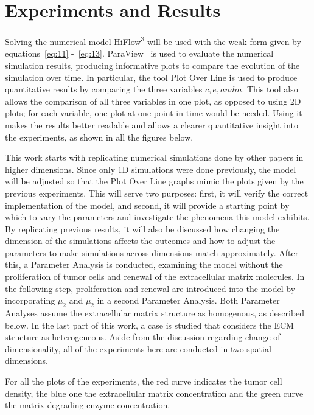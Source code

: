 

\section{Experiments and Results}
\label{sec:experiments}


Solving the numerical model HiFlow\textsuperscript{3}\cite{BibEntry2024Apr} will be used with the weak form given by equations~\ref{eq:11} -~\ref{eq:13}. ParaView~\cite{paraview} is used to evaluate the numerical simulation results, producing informative plots to compare the evolution of the simulation over time. In particular, the tool Plot Over Line is used to produce quantitative results by comparing the three variables $c,e, and m$. This tool also allows the comparison of all three variables in one plot, as opposed to using 2D plots; for each variable, one plot at one point in time would be needed. Using it makes the results better readable and allows a clearer quantitative insight into the experiments, as shown in all the figures below.

This work starts with replicating numerical simulations done by other papers in higher dimensions. Since only 1D simulations were done previously, the model will be adjusted so that the Plot Over Line graphs mimic the plots given by the previous experiments. This will serve two purposes: first, it will verify the correct implementation of the model, and second, it will provide a starting point by which to vary the parameters and investigate the phenomena this model exhibits. By replicating previous results, it will also be discussed how changing the dimension of the simulations affects the outcomes and how to adjust the parameters to make simulations across dimensions match approximately. After this, a Parameter Analysis is conducted, examining the model without the proliferation of tumor cells and renewal of the extracellular matrix molecules. In the following step, proliferation and renewal are introduced into the model by incorporating $\mu_2$ and $\mu_2$ in a second Parameter Analysis. Both Parameter Analyses assume the extracellular matrix structure as homogenous, as described below. In the last part of this work, a case is studied that considers the ECM structure as heterogeneous. Aside from the discussion regarding change of dimensionality, all of the experiments here are conducted in two spatial dimensions.

For all the plots of the experiments, the red curve indicates the tumor cell density, the blue one the extracellular matrix concentration and the green curve the matrix-degrading enzyme concentration.

